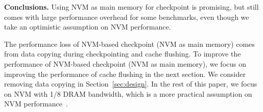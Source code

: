 \begin{comment}
From Figures~\ref{fig:prelim_design1},\ref{fig:prelim_design1_low_nvm}, \ref{fig:prelim_design1_low_nvm2}, we have a couple of interesting observations. (1) The hard drive-based, frequent checkpoint can have huge
performance loss (28\%-962\% and \textbf{TODO \%} on average).
(2) The NVM-based, frequent checkpoint can significantly
reduce the performance loss, comparing with the hard drive-based checkpoint. With an optimist assumption on NVM performance (Figure~\ref{fig:prelim_design1}), performance loss
is only 8\%-45\% (\textbf{TODO \%} on average) with NVM used as main memory. With a more practical assumption on NVM performance (Figures~\ref{fig:prelim_design1_low_nvm} and~\ref{fig:prelim_design1_low_nvm2}),
performance loss is 7\%-60\% and \textbf{TODO \%} on average (NVM with 1/8 DRAM bandwidth)
and 6\%-64\% and \textbf{TODO \%} on average (NVM with 1/32 DRAM bandwidth)
with a heterogeneous NVM/DRAM system.
(3) Using NVM as main memory for checkpoint has smaller overhead than
using NVM as a block drive. 
\end{comment}

\textbf{Conclusions.} Using NVM as main memory for checkpoint is promising, but still comes with large performance overhead for some benchmarks, even though we take an optimistic assumption on NVM performance. 

The performance loss of NVM-based checkpoint (NVM as main memory)
comes from data copying during checkpointing and cache flushing. 
To improve the performance of NVM-based checkpoint (NVM as main memory), we focus on improving the performance of cache flushing in the next section. We consider removing data copying in Section~\ref{sec:design}. 
In the rest of this paper, we focus on NVM with 1/8 DRAM bandwidth, which is a more practical assumption on NVM performance~\cite{NVMDB, eurosys16:dulloor}.

\begin{comment}
Some of the overhead is due to cache flushing (both DRAM cache and CPU caches). 
To improve CPU cache flush performance, we introduce another
design for NVM-based, frequent checkpoint with NVM as main memory.
\end{comment}

